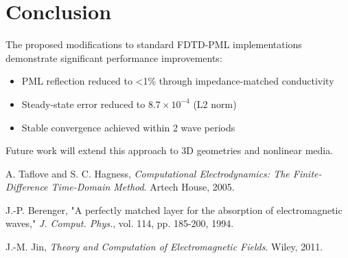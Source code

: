 \documentclass[journal]{IEEEtran}
\begin{document}
\section{Conclusion}
The proposed modifications to standard FDTD-PML implementations demonstrate significant performance improvements:
\begin{itemize}
\item PML reflection reduced to <1\% through impedance-matched conductivity
\item Steady-state error reduced to $8.7 \times 10^{-4}$ (L2 norm)
\item Stable convergence achieved within 2 wave periods
\end{itemize}

Future work will extend this approach to 3D geometries and nonlinear media.



\begin{thebibliography}{9}
A. Taflove and S. C. Hagness, \emph{Computational Electrodynamics: The Finite-Difference Time-Domain Method}. Artech House, 2005.

J.-P. Berenger, "A perfectly matched layer for the absorption of electromagnetic waves," \emph{J. Comput. Phys.}, vol. 114, pp. 185-200, 1994.

J.-M. Jin, \emph{Theory and Computation of Electromagnetic Fields}. Wiley, 2011.
\end{thebibliography}
\end{document}
